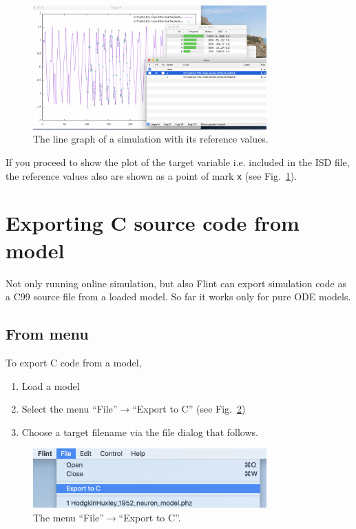 \documentclass[a4paper,10pt]{report}
\begin{document}
\begin{figure}[htbp]
\centering
\includegraphics[width=0.8\textwidth]{image/parameter-fitting-plot.png}
\caption{\label{fig:org0f6500f}The line graph of a simulation with its reference values.}
\end{figure}

If you proceed to show the plot of the target variable i.e. included in the ISD
file, the reference values also are shown as a point of mark \texttt{x} (see
Fig.~\ref{fig:org0f6500f}).

\section{Exporting C source code from model}
\label{sec:org6b26f4e}
Not only running online simulation, but also Flint can export simulation code
as a C99 source file from a loaded model. So far it works only for pure ODE models.

\subsection{From menu}
\label{sec:orgc938114}
To export C code from a model,

\begin{enumerate}
\item Load a model
\item Select the menu ``File''\(\to\)``Export to C'' (see Fig.~\ref{fig:orgb840126})
\item Choose a target filename via the file dialog that follows.
\end{enumerate}

\begin{figure}[htbp]
\centering
\includegraphics[width=0.8\textwidth]{image/export-to-c.png}
\caption{\label{fig:orgb840126}The menu ``File''\(\to\)``Export to C''.}
\end{figure}
\end{document}
